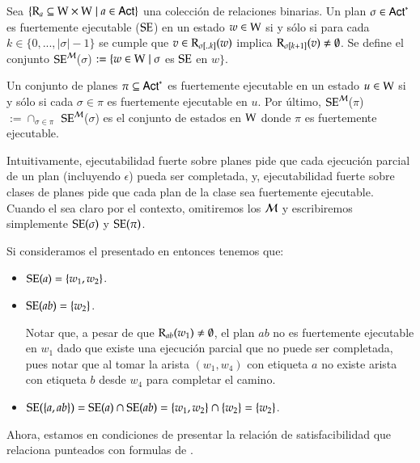 \begin{definicion}
    Sea $\{\mathrm{R}_a \subseteq \mathrm{W} \times \mathrm{W} \mid a \in {\rm \sf Act}\}$ una colección de relaciones binarias. Un plan $\sigma \in {\rm \sf Act}^*$
    es fuertemente ejecutable ($\mathrm{SE}$) en un estado $w \in \mathrm{W}$ si y sólo si para cada $k \in \{0,...,|\sigma|-1\}$ se cumple que $v \in \mathrm{R}_{\sigma[..k]}(w)$ 
    implica $\mathrm{R}_{\sigma[k+1]}(v) \neq \emptyset$. Se define el conjunto $\mathrm{SE}^{\mathcal{M}}$($\sigma$) $:= \{w \in \mathrm{W} \mid \sigma$ es 
    $\mathrm{SE}$ en $w\}$.
    
    Un conjunto de planes $\pi \subseteq {\rm \sf Act}^*$ es fuertemente ejecutable en un estado $u \in \mathrm{W}$ si y sólo si cada $\sigma \in \pi$ es fuertemente ejecutable en $u$.
    Por último, $\mathrm{SE}^{\mathcal{M}}$($\pi$) $:= \cap_{\sigma \in \pi}$ $\mathrm{SE}^{\mathcal{M}}$($\sigma$) es el conjunto de estados en $\mathrm{W}$ donde $\pi$ es fuertemente ejecutable. 
\end{definicion}

Intuitivamente, ejecutabilidad fuerte sobre planes pide que cada ejecución parcial de un plan (incluyendo $\epsilon$) pueda ser completada, y, ejecutabilidad fuerte sobre
clases de planes pide que cada plan de la clase sea fuertemente ejecutable. Cuando el \ults sea claro por el contexto, omitiremos los $\mathcal{M}$ 
y escribiremos simplemente $\mathrm{SE}(\sigma)$ y $\mathrm{SE}(\pi)$. 

\begin{ejemplo}
    Si consideramos el \ults presentado en  entonces tenemos que:
    \begin{itemize}
        \item $\mathrm{SE}(a) = \{w_1,w_2\}$.
        \item $\mathrm{SE}(ab) = \{w_2\}$.

        Notar que, a pesar de que $\mathrm{R}_{ab}(w_1) \neq \emptyset$, el plan $ab$ no es fuertemente ejecutable en $w_1$ 
        dado que existe una ejecución parcial que no puede ser completada, pues notar que al tomar la arista 
        $(w_1,w_4)$ con etiqueta $a$ no existe arista con etiqueta $b$ desde $w_4$ para completar el camino.

        \item $\mathrm{SE}(\{a,ab\}) = \mathrm{SE}(a) \cap \mathrm{SE}(ab) = \{w_1,w_2\} \cap \{w_2\} = \{w_2\}$.
    \end{itemize}
\end{ejemplo}

Ahora, estamos en condiciones de presentar la relación de satisfacibilidad que relaciona \ultss punteados con formulas de \KHilogic. 

